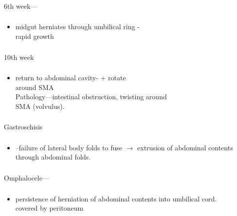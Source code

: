\documentclass[11pt]{beamer}
\begin{document}
\begin{frame}
 \frametitle{}
6th week—
\end{frame}

\begin{frame}
 \frametitle{}
\begin{itemize}
\item{midgut herniates through umbilical ring - \\ rapid growth}
\end{itemize}
\end{frame}

\begin{frame}
 \frametitle{}
10th week 
\end{frame}

\begin{frame}
 \frametitle{}
\begin{itemize}
\item{return to abdominal cavity- + rotate \\ around SMA \\ Pathology—intestinal obstruction, twisting around \\ SMA (volvulus).}
\end{itemize}
\end{frame}

\begin{frame}
 \frametitle{}
Gastroschisis
\end{frame}

\begin{frame}
 \frametitle{}
\begin{itemize}
\item{–failure of lateral body folds to fuse ${\rightarrow}$ extrusion of abdominal contents through abdominal folds.}
\end{itemize}
\end{frame}

\begin{frame}
 \frametitle{}
Omphalocele––
\end{frame}

\begin{frame}
 \frametitle{}
\begin{itemize}
\item{persistence of herniation of abdominal contents into umbilical cord. \\ covered by peritoneum }
\end{itemize}
\end{frame}
\end{document}
